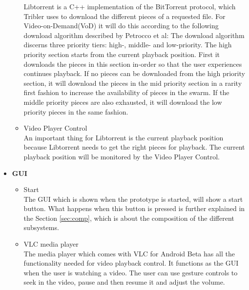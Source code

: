 \begin{itemize}
\begin{itemize}
Libtorrent is a C++ implementation of the BitTorrent protocol, which Tribler uses to download the different pieces of a requested file. For Video-on-Demand(VoD) it will do this according to the following download algorithm described by Petrocco et al\cite{libswift12}: The download algorithm discerns three priority tiers: high-, middle- and low-priority. The high priority section starts from the current playback position. First it downloads the pieces in this section in-order so that the user experiences continues playback. If no pieces can be downloaded from the high priority section, it will download the pieces in the mid priority section in a rarity first fashion to increase the availability of pieces in the swarm. If the middle priority pieces are also exhausted, it will download the low priority pieces in the same fashion. 
		\item Video Player Control\\
An important thing for Libtorrent is the current playback position because Libtorrent needs to get the right pieces for playback. The current playback position will be monitored by the Video Player Control.
	\end{itemize}
\item \textbf{GUI}
	\begin{itemize}
		\item Start\\
The GUI which is shown when the prototype is started, will show a start button. What happens when this button is pressed is further explained in the Section \ref{sec:comp}, which is about the composition of the different subsystems.
		\item VLC media player\\
The media player which comes with VLC for Android Beta has all the functionality needed for video playback control. It functions as the GUI when the user is watching a video. The user can use gesture controls to seek in the video, pause and then resume it and adjust the volume.
	\end{itemize}
\end{itemize}
